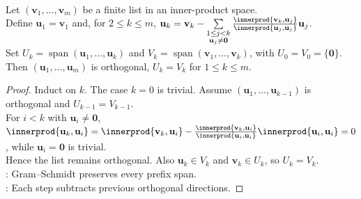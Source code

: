 \begin{theorem} \label{thm:gram-schmidt-arbitrary-list} \\
Let $(\mathbf{v}_1,\ldots,\mathbf{v}_m)$ be a finite list in an inner-product space.\\
Define $\mathbf{u}_1=\mathbf{v}_1$ and, for $2\leq k\leq m$, $\mathbf{u}_k=\mathbf{v}_k-\sum\limits_{\substack{1\leq j<k\\ \mathbf{u}_j\neq\mathbf{0}}} \frac{\innerprod{\mathbf{v}_k,\mathbf{u}_j}}{\innerprod{\mathbf{u}_j,\mathbf{u}_j}}\mathbf{u}_j$.\\
Set $U_k=\operatorname{span}(\mathbf{u}_1,\ldots,\mathbf{u}_k)$ and $V_k=\operatorname{span}(\mathbf{v}_1,\ldots,\mathbf{v}_k)$, with $U_0=V_0=\{\mathbf{0}\}$.\\
Then $(\mathbf{u}_1,\ldots,\mathbf{u}_m)$ is orthogonal, $U_k=V_k$ for $1\leq k\leq m$.\\
\begin{proof}
Induct on $k$. The case $k=0$ is trivial. Assume $(\mathbf{u}_1,\ldots,\mathbf{u}_{k-1})$ is orthogonal and $U_{k-1}=V_{k-1}$.\\
For $i<k$ with $\mathbf{u}_i\neq\mathbf{0}$, $\innerprod{\mathbf{u}_k,\mathbf{u}_i} =\innerprod{\mathbf{v}_k,\mathbf{u}_i} -\frac{\innerprod{\mathbf{v}_k,\mathbf{u}_i}}{\innerprod{\mathbf{u}_i,\mathbf{u}_i}}\innerprod{\mathbf{u}_i,\mathbf{u}_i} =0$, while $\mathbf{u}_i=\mathbf{0}$ is trivial.\\
Hence the list remains orthogonal. Also $\mathbf{u}_k\in V_k$ and $\mathbf{v}_k\in U_k$, so $U_k=V_k$.\\
: Gram--Schmidt preserves every prefix span.\\
: Each step subtracts previous orthogonal directions.
\end{proof}
\end{theorem}

